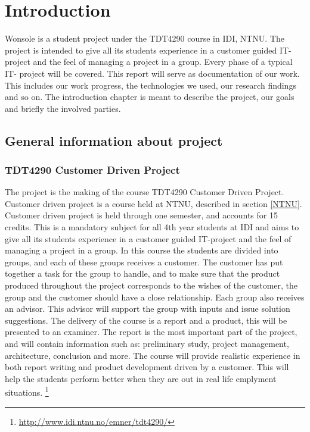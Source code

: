 \chapter{Introduction}

\minitoc

Wonsole is a student project under the TDT4290 course in IDI, NTNU. The project is intended to give all its students experience in a customer guided IT- project and the feel of managing a project in a group. Every phase of a typical IT- project will be covered. This report will serve as documentation of our work. This includes our work progress, the technologies we used, our research findings and so on. The introduction chapter is meant to describe the project, our goals and briefly the involved parties.

\clearpage

\section{General information about project}

\subsection{TDT4290 Customer Driven Project}
The project is the making of the course TDT4290 Customer Driven Project. Customer driven project is a course held at NTNU, described in section \ref{NTNU}. Customer driven project is held through one semester, and accounts for 15 credits. This is a mandatory subject for all 4th year students at IDI and aims to give all its students experience in a customer guided IT-project and the feel of managing a project in a group. In this course the students are divided into groups, and each of these groups receives a customer. 
The customer has put together a task for the group to handle, and to make sure that the product produced throughout the project corresponds to the wishes of the customer, the group and the customer should have a close relationship. 
Each group also receives an advisor. This advisor will support the group with inputs and issue solution suggestions. 
The delivery of the course is a report and a product, this will be presented to an examiner. The report is the most important part of the project, and will contain information such as: preliminary study, project management, architecture, conclusion and more. 
The course will provide realistic experience in both report writing and product development driven by a customer. This will help the students perform better when they are out in real life emplyment situations.
\footnote{\url{http://www.idi.ntnu.no/emner/tdt4290/}}

